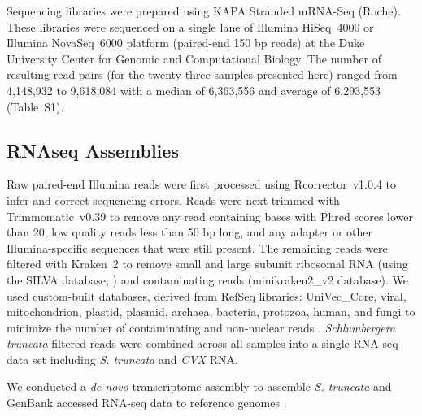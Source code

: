 \documentclass[fleqn,10pt,lineno]{wlpeerj}
\begin{document}
Sequencing libraries were prepared using KAPA Stranded mRNA-Seq (Roche).
These libraries were sequenced on a single lane of Illumina \mbox{HiSeq}~4000 or Illumina \mbox{NovaSeq}~6000 platform (paired-end 150 bp reads) at the Duke University Center for Genomic and Computational Biology.
The number of resulting read pairs (for the twenty-three samples presented here) ranged from 4,148,932 to 9,618,084 with a median of 6,363,556 and average of 6,293,553 (Table~S1).

\subsection*{RNAseq Assemblies}

Raw paired-end Illumina reads were first processed using \mbox{Rcorrector}~v1.0.4 \citep{song2015} to infer and correct sequencing errors.
Reads were next trimmed with \mbox{Trimmomatic}~v0.39 \citep{bolger2014} to remove any read containing bases with Phred scores lower than 20, low quality reads less than 50 bp long, and any adapter or other Illumina-specific sequences that were still present.
The remaining reads were filtered with \mbox{Kraken}~2 \citep{wood2019} to remove small and large subunit ribosomal RNA (using the SILVA database; \citealt{quast2013}) and contaminating reads (minikraken2\_v2 database).
We used custom-built databases, derived from RefSeq libraries: UniVec\_Core, viral, mitochondrion, plastid, plasmid, archaea, bacteria, protozoa, human, and fungi to minimize the number of contaminating and non-nuclear reads \citep{ramanauskas2021}.
\textit{Schlumbergera truncata} filtered reads were combined across all samples into a single RNA-seq data set including \textit{S. truncata} and \textit{CVX} RNA.


We conducted a \textit{de novo} transcriptome assembly 
to assemble \textit{S. truncata} and GenBank accessed RNA-seq data to reference genomes .
\end{document}
